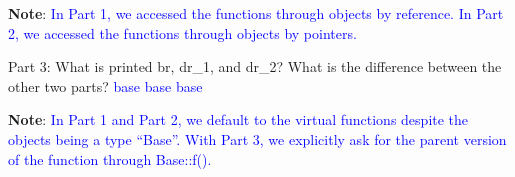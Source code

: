 \documentclass{article}
\begin{document}
\begin{enumerate}[label=(\alph*)]
    \vspace{1cm}
    
\textbf{Note}: \textcolor{blue}{In Part 1, we accessed the functions through objects by reference. In Part 2, we accessed the functions through objects by pointers.}

    \vspace{2cm}
    Part 3:
    What is printed br, dr\_1, and dr\_2? What is the difference between the other two parts?
    \newline\textcolor{blue}{base}
    \newline\textcolor{blue}{base}
    \newline\textcolor{blue}{base}
    \vspace{2cm}
    \end{enumerate}

\textbf{Note}: \textcolor{blue}{In Part 1 and Part 2, we default to the virtual functions despite the objects being a type “Base”. With Part 3, we explicitly ask for the parent version of the function through Base::f().}




    
\end{document}
